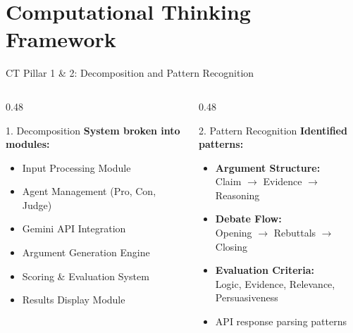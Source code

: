 \documentclass[aspectratio=169]{beamer}
\begin{document}
\section{Computational Thinking Framework}
\begin{frame}{CT Pillar 1 \& 2: Decomposition and Pattern Recognition}
    \begin{columns}[t]
        \begin{column}{0.48\textwidth}
            \begin{block}{1. Decomposition}
                \textbf{System broken into modules:}
                \begin{itemize}
                    \item Input Processing Module
                    \item Agent Management (Pro, Con, Judge)
                    \item Gemini API Integration
                    \item Argument Generation Engine
                    \item Scoring \& Evaluation System
                    \item Results Display Module
                \end{itemize}
            \end{block}
        \end{column}
        
        \begin{column}{0.48\textwidth}
            \begin{block}{2. Pattern Recognition}
                \textbf{Identified patterns:}
                \begin{itemize}
                    \item \textbf{Argument Structure:}\\
                    Claim $\rightarrow$ Evidence $\rightarrow$ Reasoning
                    \item \textbf{Debate Flow:}\\
                    Opening $\rightarrow$ Rebuttals $\rightarrow$ Closing
                    \item \textbf{Evaluation Criteria:}\\
                    Logic, Evidence, Relevance, Persuasiveness
                    \item API response parsing patterns
                \end{itemize}
            \end{block}
        \end{column}
    \end{columns}
\end{frame}
\end{document}
